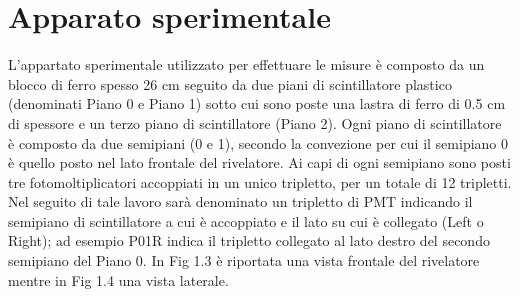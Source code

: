 \documentclass[12pt,a4paper]{report}
\begin{document}
\section{Apparato sperimentale}
L'appartato sperimentale utilizzato per effettuare le misure è composto da un blocco di ferro spesso 26 cm seguito da due piani di scintillatore plastico (denominati Piano 0 e Piano 1) sotto cui sono poste una lastra di ferro di 0.5 cm di spessore e un terzo piano di scintillatore (Piano 2).
Ogni piano di scintillatore è composto da due semipiani (0 e 1), secondo la convezione per cui il semipiano 0 è quello posto nel lato frontale del rivelatore. Ai capi di ogni semipiano sono posti tre fotomoltiplicatori accoppiati in un unico tripletto, per un totale di 12 tripletti. Nel seguito di tale lavoro sarà denominato un tripletto di PMT indicando il semipiano di scintillatore a cui è accoppiato e il lato su cui è collegato (Left o Right); ad esempio P01R indica il tripletto collegato al lato destro del secondo semipiano del Piano 0.
In Fig 1.3 è riportata una vista frontale del rivelatore mentre in Fig 1.4 una vista laterale.
\clearpage

\begin{figure}[!htb]
  \centering
  \quad
  \\
  \quad
  \\
  \caption{}
  \label{fig:detector_sides}
\end{figure}
\end{document}
